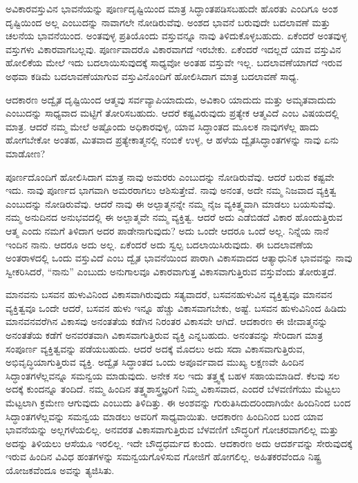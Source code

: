 \vskip 5pt

ಅವಿಕಾರವಸ್ತುವಿನ ಭಾವನೆಯನ್ನು ಪೂರ್ಣದೃಷ್ಟಿಯಿಂದ ಮಾತ್ರ ಸಿದ್ಧಾಂತಪಡಿಸ\break ಬಹುದೇ ಹೊರತು ಎಂದಿಗೂ ಅಂಶ ದೃಷ್ಟಿಯಿಂದ ಅಲ್ಲ ಎಂಬುದನ್ನು ನಾವಾಗಲೇ ನೋಡಿರುವೆವು. ಅಂಶದ ಭಾವನೆ ಬರುವುದೇ ಬದಲಾವಣೆ ಮತ್ತು ಚಲನೆಯ ಭಾವನೆಯಿಂದ. ಅಂತವುಳ್ಳ ಪ್ರತಿಯೊಂದು ವಸ್ತುವನ್ನೂ ನಾವು ತಿಳಿದುಕೊಳ್ಳಬಹುದು. ಏಕೆಂದರೆ ಅಂತವುಳ್ಳ ವಸ್ತುಗಳು ವಿಕಾರವಾಗಬಲ್ಲವು. ಪೂರ್ಣವಾದರೊ ವಿಕಾರವಾಗದೆ ಇರಬೇಕು. ಏಕೆಂದರೆ ಇದಲ್ಲದೆ ಯಾವ ವಸ್ತುವಿನ ಹೋಲಿಕೆಯ ಮೇಲೆ ಇದು ಬದಲಾಯಿಸುವುದಕ್ಕೆ ಸಾಧ್ಯವೋ ಅಂತಹ ವಸ್ತುವೇ ಇಲ್ಲ. ಬದಲಾವಣೆಯಾಗದೆ ಇರುವ ಅಥವಾ ಕಡಿಮೆ ಬದಲಾವಣೆಯಾಗುವ ವಸ್ತುವಿನೊಂದಿಗೆ ಹೋಲಿಸಿದಾಗ ಮಾತ್ರ ಬದಲಾವಣೆ ಸಾಧ್ಯ. 

\vskip 5pt

ಆದಕಾರಣ ಅದ್ವೈತ ದೃಷ್ಟಿಯಿಂದ ಆತ್ಮವು ಸರ್ವವ್ಯಾಪಿಯಾದುದು, ಅವಿಕಾರಿ ಯಾದುದು ಮತ್ತು ಅಮೃತವಾದುದು ಎಂಬುದನ್ನು ಸಾಧ್ಯವಾದ ಮಟ್ಟಿಗೆ ತೋರಿಸಬಹುದು. ಆದರೆ ಕಷ್ಟವಿರುವುದು ಪ್ರತ್ಯೇಕ ಆತ್ಮವಿದೆ ಎಂಬ ವಿಷಯದಲ್ಲಿ ಮಾತ್ರ. ಆದರೆ ನಮ್ಮ ಮೇಲೆ ಅಷ್ಟೊಂದು ಅಧಿಕಾರವುಳ್ಳ, ಯಾವ ಸಿದ್ಧಾಂತದ ಮೂಲಕ ನಾವುಗಳೆಲ್ಲ ಹಾದು ಹೋಗಬೇಕೋ ಅಂತಹ, ಮಿತವಾದ ಪ್ರತ್ಯೇಕಾತ್ಮನಲ್ಲಿ ನಂಬಿಕೆ ಉಳ್ಳ, ಆ ಹಳೆಯ ದ್ವೈತಸಿದ್ಧಾಂತಗಳನ್ನು ನಾವು ಏನು ಮಾಡೋಣ?

\vskip 5pt

ಪೂರ್ಣದೊಂದಿಗೆ ಹೋಲಿಸಿದಾಗ ಮಾತ್ರ ನಾವು ಅಮರರು ಎಂಬುದನ್ನು ನೋಡಿರುವೆವು. ಆದರೆ ಬರುವ ಕಷ್ಟವೇ ಇದು. ನಾವು ಪೂರ್ಣದ ಭಾಗವಾಗಿ ಅಮರರಾಗಲು ಆಶಿಸುತ್ತೇವೆ. ನಾವು ಅನಂತ, ಅದೇ ನಮ್ಮ ನಿಜವಾದ ವ್ಯಕ್ತಿತ್ವ ಎಂಬುದನ್ನು ನೋಡಿರುವೆವು. ಆದರೆ ನಾವು ಈ ಅಲ್ಪಾತ್ಮನನ್ನೇ ನಮ್ಮ ನೈಜ ವ್ಯಕಿತ್ತ್ವವಾಗಿ ಮಾಡಲು ಬಯಸುವೆವು. ನಮ್ಮ ಅನುದಿನದ ಅನುಭವದಲ್ಲಿ ಈ ಅಲ್ಪಾತ್ಮವೇ ನಮ್ಮ ವ್ಯಕ್ತಿತ್ವ. ಆದರೆ ಅದು ಎಡೆಬಿಡದೆ ವಿಕಾರ ಹೊಂದುತ್ತಿರುವ ಆತ್ಮ ಎಂದು ನಮಗೆ ತಿಳಿದಾಗ ಅದರ ಪಾಡೇನಾಗುವುದು? ಅದು ಒಂದೇ ಆದರೂ ಒಂದೆ ಅಲ್ಲ. ನಿನ್ನೆಯ ನಾನೆ ಇಂದಿನ ನಾನು. ಆದರೂ ಅದು ಅಲ್ಲ. ಏಕೆಂದರೆ ಅದು ಸ್ವಲ್ಪ ಬದಲಾಯಿಸಿರುವುದು. ಈ ಬದಲಾವಣೆಯ ಅಂತರಾಳದಲ್ಲಿ ಒಂದು ವಸ್ತುವಿದೆ ಎಂಬ ದ್ವೈತ ಭಾವನೆಯಿಂದ ಪಾರಾಗಿ ವಿಕಾಸವಾದದ ಆತ್ಯಾಧುನಿಕ ಭಾವವನ್ನು ನಾವು ಸ್ವೀಕರಿಸಿದರೆ, “ನಾನು” ಎಂಬುದು ಅನುಗಾಲವೂ ವಿಕಾರವಾಗುತ್ತ ವಿಕಾಸವಾಗುತ್ತಿರುವ ವಸ್ತುವೆಂದು ತೋರುತ್ತದೆ. 

\vskip 5pt

ಮಾನವನು ಬಸವನ ಹುಳುವಿನಿಂದ ವಿಕಾಸವಾಗಿರುವುದು ಸತ್ಯವಾದರೆ, ಬಸವನಹುಳುವಿನ ವ್ಯಕ್ತಿತ್ವವೂ ಮಾನವನ ವ್ಯಕ್ತಿತ್ವವೂ ಒಂದೇ ಆದರೆ, ಬಸವನ ಹುಳು ಇನ್ನೂ ಹೆಚ್ಚು ವಿಕಾಸವಾಗಬೇಕು, ಅಷ್ಟೆ. ಬಸವನ ಹುಳುವಿನಿಂದ ಹಿಡಿದು ಮಾನವನವರೆಗಿನ ವಿಕಾಸವು ಅನಂತತೆಯ ಕಡೆಗಿನ ನಿರಂತರ ವಿಕಾಸವೇ ಆಗಿದೆ. ಆದಕಾರಣ ಈ ಜೀವಾತ್ಮನನ್ನು ಅನಂತತೆಯ ಕಡೆಗೆ ಅನವರತವಾಗಿ ವಿಕಾಸವಾಗುತ್ತಿರುವ ವ್ಯಕ್ತಿ ಎನ್ನಬಹುದು. ಅನಂತವನ್ನು ಸೇರಿದಾಗ ಮಾತ್ರ ಸಂಪೂರ್ಣ ವ್ಯಕ್ತಿತ್ವವನ್ನು ಪಡೆಯಬಹುದು. ಆದರೆ ಅದಕ್ಕೆ ಮೊದಲು ಅದು ಸದಾ ವಿಕಾಸವಾಗುತ್ತಿರುವ, ಅಭಿವೃದ್ಧಿಯಾಗುತ್ತಿರುವ ವ್ಯಕ್ತಿ. ಅದ್ವೈತ ಸಿದ್ಧಾಂತದ ಒಂದು ಅಪೂರ್ವವಾದ ಮುಖ್ಯ ಲಕ್ಷಣವೇ ಹಿಂದಿನ ಸಿದ್ಧಾಂತಗಳೆಲ್ಲವನ್ನೂ ಸಮನ್ವಯ ಮಾಡುವುದು. ಅನೇಕ ಸಲ ಇದು ತತ್ತ್ವಕ್ಕೆ ಬಹಳ ಸಹಾಯಮಾಡಿದೆ. ಕೆಲವು ಸಲ ಅದಕ್ಕೆ ಕುಂದನ್ನೂ ತಂದಿದೆ. ನಮ್ಮ ಹಿಂದಿನ ತತ್ತ್ವಶಾಸ್ತ್ರಜ್ಞರಿಗೆ ನಿಮ್ಮ ವಿಕಾಸವಾದ, ಎಂದರೆ ಬೆಳವಣಿಗೆಯು ಮೆಟ್ಟಲು ಮೆಟ್ಟಲಾಗಿ ಕ್ರಮೇಣ ಆಗುವುದು ಎಂಬುದು ತಿಳಿದಿತ್ತು. ಈ ಅಂಶವನ್ನು ಗುರುತಿಸಿದುದರಿಂದಾಗಿಯೇ ಹಿಂದಿನಿಂದ ಬಂದ ಸಿದ್ಧಾಂತಗಳೆಲ್ಲವನ್ನು ಸಮನ್ವಯ ಮಾಡಲು ಅವರಿಗೆ ಸಾಧ್ಯವಾಯಿತು. ಆದಕಾರಣ ಹಿಂದಿನಿಂದ ಬಂದ ಯಾವ ಭಾವನೆಯನ್ನು ಅಲ್ಲಗಳೆಯಲಿಲ್ಲ. ಅನವರತ ವಿಕಾಸವಾಗುತ್ತಿರುವ ಬೆಳವಣಿಗೆ ಬೌದ್ಧರಿಗೆ ಗೋಚರವಾಗಲಿಲ್ಲ ಮತ್ತು ಅದನ್ನು ತಿಳಿಯಲು ಆಸೆಯೂ ಇರಲಿಲ್ಲ. ಇದೇ ಬೌದ್ಧಧರ್ಮದ ಕುಂದು. ಆದಕಾರಣ ಅದು ಆದರ್ಶವನ್ನು ಸೇರುವುದಕ್ಕೆ ಇರುವ ಹಿಂದಿನ ವಿವಿಧ ಹಂತಗಳನ್ನು ಸಮನ್ವಯಗೊಳಿಸುವ ಗೋಜಿಗೆ ಹೋಗಲಿಲ್ಲ. ಅಹಿತಕರವೆಂದೂ ನಿಷ್ಟ್ರ ಯೋಜಕವೆಂದೂ ಅವನ್ನು ತ್ಯಜಿಸಿತು. 

